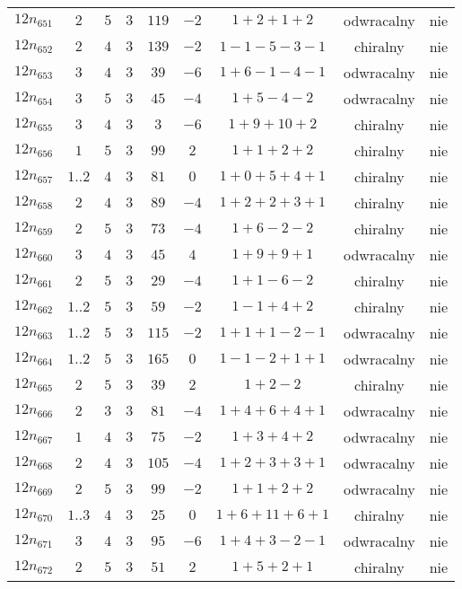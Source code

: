 \begin{longtable}{ccccccccc}
$12n_{651}$ & $2$ & $5$ & $3$ & $119$ & $-2$ & $1+2+1+2$ & odwracalny & nie \\
$12n_{652}$ & $2$ & $4$ & $3$ & $139$ & $-2$ & $1-1-5-3-1$ & chiralny & nie \\
$12n_{653}$ & $3$ & $4$ & $3$ & $39$ & $-6$ & $1+6-1-4-1$ & odwracalny & nie \\
$12n_{654}$ & $3$ & $5$ & $3$ & $45$ & $-4$ & $1+5-4-2$ & odwracalny & nie \\
$12n_{655}$ & $3$ & $4$ & $3$ & $3$ & $-6$ & $1+9+10+2$ & chiralny & nie \\
$12n_{656}$ & $1$ & $5$ & $3$ & $99$ & $2$ & $1+1+2+2$ & chiralny & nie \\
$12n_{657}$ & $1..2$ & $4$ & $3$ & $81$ & $0$ & $1+0+5+4+1$ & chiralny & nie \\
$12n_{658}$ & $2$ & $4$ & $3$ & $89$ & $-4$ & $1+2+2+3+1$ & chiralny & nie \\
$12n_{659}$ & $2$ & $5$ & $3$ & $73$ & $-4$ & $1+6-2-2$ & chiralny & nie \\
$12n_{660}$ & $3$ & $4$ & $3$ & $45$ & $4$ & $1+9+9+1$ & odwracalny & nie \\
$12n_{661}$ & $2$ & $5$ & $3$ & $29$ & $-4$ & $1+1-6-2$ & chiralny & nie \\
$12n_{662}$ & $1..2$ & $5$ & $3$ & $59$ & $-2$ & $1-1+4+2$ & chiralny & nie \\
$12n_{663}$ & $1..2$ & $5$ & $3$ & $115$ & $-2$ & $1+1+1-2-1$ & odwracalny & nie \\
$12n_{664}$ & $1..2$ & $5$ & $3$ & $165$ & $0$ & $1-1-2+1+1$ & odwracalny & nie \\
$12n_{665}$ & $2$ & $5$ & $3$ & $39$ & $2$ & $1+2-2$ & chiralny & nie \\
$12n_{666}$ & $2$ & $3$ & $3$ & $81$ & $-4$ & $1+4+6+4+1$ & odwracalny & nie \\
$12n_{667}$ & $1$ & $4$ & $3$ & $75$ & $-2$ & $1+3+4+2$ & odwracalny & nie \\
$12n_{668}$ & $2$ & $4$ & $3$ & $105$ & $-4$ & $1+2+3+3+1$ & odwracalny & nie \\
$12n_{669}$ & $2$ & $5$ & $3$ & $99$ & $-2$ & $1+1+2+2$ & odwracalny & nie \\
$12n_{670}$ & $1..3$ & $4$ & $3$ & $25$ & $0$ & $1+6+11+6+1$ & chiralny & nie \\
$12n_{671}$ & $3$ & $4$ & $3$ & $95$ & $-6$ & $1+4+3-2-1$ & odwracalny & nie \\
$12n_{672}$ & $2$ & $5$ & $3$ & $51$ & $2$ & $1+5+2+1$ & chiralny & nie \\

\end{longtable}
